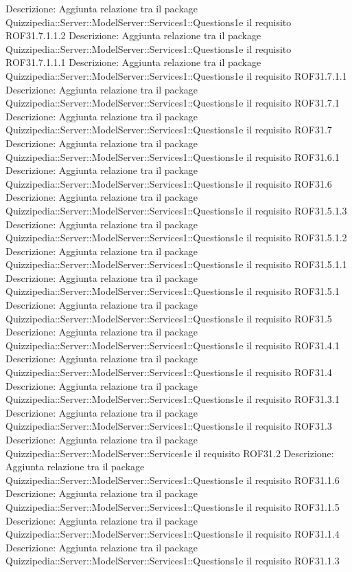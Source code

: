 Descrizione: Aggiunta relazione tra il package Quizzipedia::Server::ModelServer::Services1::Questions1e il requisito ROF31.7.1.1.2 
Descrizione: Aggiunta relazione tra il package Quizzipedia::Server::ModelServer::Services1::Questions1e il requisito ROF31.7.1.1.1 
Descrizione: Aggiunta relazione tra il package Quizzipedia::Server::ModelServer::Services1::Questions1e il requisito ROF31.7.1.1 
Descrizione: Aggiunta relazione tra il package Quizzipedia::Server::ModelServer::Services1::Questions1e il requisito ROF31.7.1 
Descrizione: Aggiunta relazione tra il package Quizzipedia::Server::ModelServer::Services1::Questions1e il requisito ROF31.7 
Descrizione: Aggiunta relazione tra il package Quizzipedia::Server::ModelServer::Services1::Questions1e il requisito ROF31.6.1 
Descrizione: Aggiunta relazione tra il package Quizzipedia::Server::ModelServer::Services1::Questions1e il requisito ROF31.6 
Descrizione: Aggiunta relazione tra il package Quizzipedia::Server::ModelServer::Services1::Questions1e il requisito ROF31.5.1.3 
Descrizione: Aggiunta relazione tra il package Quizzipedia::Server::ModelServer::Services1::Questions1e il requisito ROF31.5.1.2 
Descrizione: Aggiunta relazione tra il package Quizzipedia::Server::ModelServer::Services1::Questions1e il requisito ROF31.5.1.1 
Descrizione: Aggiunta relazione tra il package Quizzipedia::Server::ModelServer::Services1::Questions1e il requisito ROF31.5.1 
Descrizione: Aggiunta relazione tra il package Quizzipedia::Server::ModelServer::Services1::Questions1e il requisito ROF31.5 
Descrizione: Aggiunta relazione tra il package Quizzipedia::Server::ModelServer::Services1::Questions1e il requisito ROF31.4.1 
Descrizione: Aggiunta relazione tra il package Quizzipedia::Server::ModelServer::Services1::Questions1e il requisito ROF31.4 
Descrizione: Aggiunta relazione tra il package Quizzipedia::Server::ModelServer::Services1::Questions1e il requisito ROF31.3.1 
Descrizione: Aggiunta relazione tra il package Quizzipedia::Server::ModelServer::Services1::Questions1e il requisito ROF31.3 
Descrizione: Aggiunta relazione tra il package Quizzipedia::Server::ModelServer::Services1e il requisito ROF31.2 
Descrizione: Aggiunta relazione tra il package Quizzipedia::Server::ModelServer::Services1::Questions1e il requisito ROF31.1.6 
Descrizione: Aggiunta relazione tra il package Quizzipedia::Server::ModelServer::Services1::Questions1e il requisito ROF31.1.5 
Descrizione: Aggiunta relazione tra il package Quizzipedia::Server::ModelServer::Services1::Questions1e il requisito ROF31.1.4 
Descrizione: Aggiunta relazione tra il package Quizzipedia::Server::ModelServer::Services1::Questions1e il requisito ROF31.1.3 
